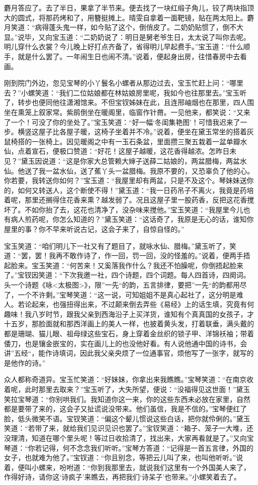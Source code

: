 \documentclass[12pt,oneside]{book}
\begin{document}
麝月答应了。去了半日，果拿了半节来。便去找了一块红缎子角儿，铰了两块指顶大的圆式，将那药烤和了，用簪挺摊上。晴雯自拿着一面靶镜，贴在两太阳上。麝月笑道：“病得蓬头鬼一样，如今贴了这个，倒俏皮了。二奶奶贴惯了，倒不大显。”说毕，又向宝玉道：“二奶奶说了：明日是舅老爷生日，太太说了叫你去呢。明儿穿什么衣裳？今儿晚上好打点齐备了，省得明儿早起费手。”宝玉道：“什么顺手，就是什么罢了。一年闹生日也闹不清。”说着，便起身出房，往惜春房中去看画。

刚到院门外边，忽见宝琴的小丫鬟名小螺者从那边过去，宝玉忙赶上问：“哪里去？”小螺笑道：“我们二位姑娘都在林姑娘房里呢，我如今也往那里去。”宝玉听了，转步也便同他往潇湘馆来。不但宝钗姊妹在此，且连邢岫烟也在那里，四人围坐在熏笼上叙家常。紫鹃倒坐在暖阁里，临窗作针黹。一见他来，都笑说：“又来了一个！可没了你的坐处了。”宝玉笑道：“好一幅‘冬闺集艳图’！可惜我迟来了一步。横竖这屋子比各屋子暖，这椅子坐着并不冷。”说着，便坐在黛玉常坐的搭着灰鼠椅搭的一张椅上。因见暖阁之中有一玉石条盆，里面攒三聚五栽着一盆单瓣水仙，点着宣石，便极口赞道：“好花！这屋子越暖，这花香得越浓。怎昨日未见？”黛玉因说道：“这是你家大总管赖大婶子送薛二姑娘的，两盆腊梅，两盆水仙。他送了我一盆水仙，送了蕉丫头一盆腊梅。我原不要的，又恐辜负了他的心。你若要，我转送你如何？”宝玉道：“我屋里却有两盆，只是不及这个。琴妹妹送你的，如何又转送人，这个断使不得！”黛玉道：“我一日药吊子不离火，我竟是药培着呢，那里还搁得住花香来熏？越发弱了。况且这屋子里一股药香，反把这花香搅坏了。不如你抬了去，这花也清净了，没杂味来搅他。”宝玉笑道：“我屋里今儿也有病人煎药呢，你怎么知道的？”黛玉笑道：“这话奇了，我原是无心的话，谁知你屋里的事？你不早来听说古记，这会子来了，自惊自怪的。”

宝玉笑道：“咱们明儿下一社又有了题目了，就咏水仙、腊梅。”黛玉听了，笑道：“罢，罢！我再不敢作诗了，作一回，罚一回，没的怪羞的。”说着，便两手捂起脸来。宝玉笑道：“何苦来！又奚落我作什么？我还不怕臊呢，你倒捂起脸来了。”宝钗因笑道：“下次我邀一社，四个诗题，四个词题。每人四首诗，四阕词。头一个诗题《咏<太极图>》，限”一先“的韵，五言排律，要把”一先“的韵都用尽了，一个不许剩。”宝琴笑道：“这一说，可知姐姐不是真心起社了，这分明是难人。若论起来，也强扭得出来，不过颠来倒去弄些《易经》上的话生填，究竟有何趣味！我八岁时节，跟我父亲到西海沿子上买洋货，谁知有个真真国的女孩子，才十五岁，那脸面就和那西洋画上的美人一样，也披着黄头发，打着联垂，满头戴的都是珊瑚、猫儿眼、祖母绿这些宝石，身上穿着金丝织的锁子甲、洋锦袄袖；带着倭刀，也是镶金嵌宝的，实在画儿上的也没他好看。有人说他通中国的诗书，会讲”五经“，能作诗填词，因此我父亲央烦了一位通事官，烦他写了一张字，就写的是他作的诗。”

众人都称奇道异。宝玉忙笑道：“好妹妹，你拿出来我瞧瞧。”宝琴笑道：“在南京收着呢，此时那里去取来？”宝玉听了，大失所望，便说：“没福得见这世面！”黛玉笑拉宝琴道：“你别哄我们。我知道你这一来，你的这些东西未必放在家里，自然都是要带了来的，这会子又扯谎说没带来。他们虽信，我是不信的。”宝琴便红了脸，低头微笑不语。宝钗笑道：“偏这个颦儿惯说这些白话，把你就伶俐的。”黛玉笑道：“若带了来，就给我们见识见识也罢了。”宝钗笑道：“箱子、笼子一大堆，还没理清，知道在哪个里头呢！等过日收拾清了，找出来，大家再看就是了。”又向宝琴道：“你若记得，何不念念我们听听。”宝琴方答道：“记得是一首五言律，外国的女子，也就难为他了。”宝钗道：“你且别念，等把云儿叫了来，也叫他听听。”说着，便叫小螺来，吩咐道：“你到我那里去，就说我们这里有一个外国美人来了，作得好诗，请你这‘诗疯子’来瞧去，再把我们‘诗呆子’也带来。”小螺笑着去了。
\end{document}
